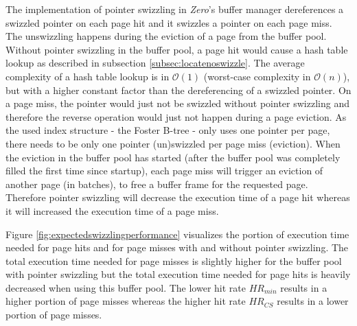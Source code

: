     The implementation of pointer swizzling in \emph{Zero}'s buffer manager dereferences a swizzled pointer on each page hit and it swizzles a pointer on each page miss. The unswizzling happens during the eviction of a page from the buffer pool. Without pointer swizzling in the buffer pool, a page hit would cause a hash table lookup as described in subsection \ref{subsec:locatenoswizzle}. The average complexity of a hash table lookup is in $\mathcal{O}\left(1\right)$ (worst-case complexity in $\mathcal{O}\left(n\right)$), but with a higher constant factor than the dereferencing of a swizzled pointer. On a page miss, the pointer would just not be swizzled without pointer swizzling and therefore the reverse operation would just not happen during a page eviction. As the used index structure - the Foster B-tree - only uses one pointer per page, there needs to be only one pointer (un)swizzled per page miss (eviction). When the eviction in the buffer pool has started (after the buffer pool was completely filled the first time since startup), each page miss will trigger an eviction of another page (in batches), to free a buffer frame for the requested page. Therefore pointer swizzling will decrease the execution time of a page hit whereas it will increased the execution time of a page miss.

    Figure \ref{fig:expectedswizzlingperformance} visualizes the portion of execution time needed for page hits and for page misses with and without pointer swizzling. The total execution time needed for page misses is slightly higher for the buffer pool with pointer swizzling but the total execution time needed for page hits is heavily decreased when using this buffer pool. The lower hit rate $HR_{min}$ results in a higher portion of page misses whereas the higher hit rate $HR_{CS}$ results in a lower portion of page misses.

